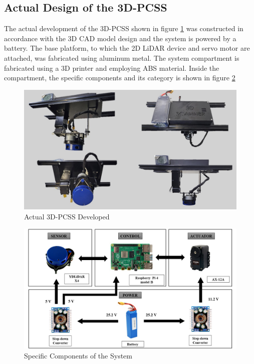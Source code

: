 \subsection{Actual Design of the 3D-PCSS}

The actual development of the 3D-PCSS shown in figure \ref{ch4:fig:actual-3d-pcss} was constructed in accordance with the 3D CAD model design and the system is powered by a battery. The base platform, to which the 2D LiDAR device and servo motor are attached, was fabricated using aluminum metal. The system compartment is fabricated using a 3D printer and employing ABS material. Inside the compartment, the specific components and its category is shown in figure \ref{ch4:fig:specific-components}
\begin{figure}[H]
	\centering
	\includegraphics[width=1\textwidth]{Figures/actual-3d-pcss}
	\caption{Actual 3D-PCSS Developed}
	\label{ch4:fig:actual-3d-pcss}
\end{figure}

\begin{figure}[H]
	\centering
	\includegraphics[width=1\textwidth]{Figures/specific-components}
	\caption{Specific Components of the System}
	\label{ch4:fig:specific-components}
\end{figure}

